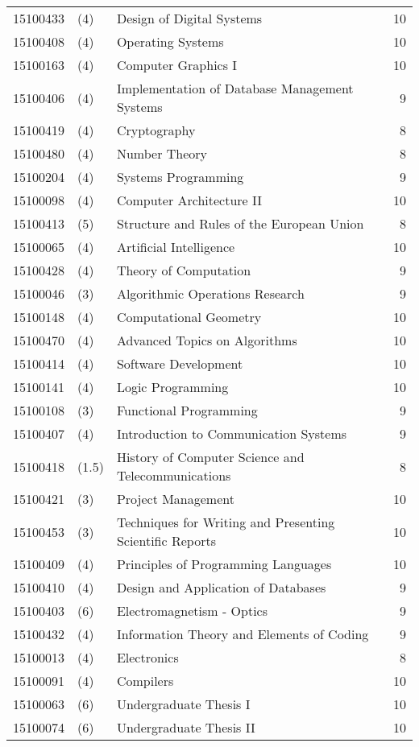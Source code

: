\documentclass[11pt,a4paper]{article}
\begin{document}
\begin{center}
\begin{longtable}{lllr}
    15100433 & (4) & Design of Digital Systems & 10 \\
    15100408 & (4) & Operating Systems & 10 \\
    15100163 & (4) & Computer Graphics I & 10 \\
    15100406 & (4) & Implementation of Database Management Systems & 9 \\
    15100419 & (4) & Cryptography & 8 \\
    15100480 & (4) & Number Theory & 8 \\
    15100204 & (4) & Systems Programming & 9 \\
    15100098 & (4) & Computer Architecture II & 10 \\
    15100413 & (5) & Structure and Rules of the European Union & 8 \\

    15100065 & (4) & Artificial Intelligence & 10 \\
    15100428 & (4) & Theory of Computation & 9 \\
    15100046 & (3) & Algorithmic Operations Research & 9 \\
    15100148 & (4) & Computational Geometry & 10 \\
    15100470 & (4) & Advanced Topics on Algorithms & 10 \\
    15100414 & (4) & Software Development & 10 \\
    15100141 & (4) & Logic Programming & 10 \\
    15100108 & (3) & Functional Programming & 9 \\
    15100407 & (4) & Introduction to Communication Systems & 9 \\
    15100418 & (1.5) & History of Computer Science and Telecommunications & 8 \\
    15100421 & (3) & Project Management & 10 \\
    15100453 & (3) & Techniques for Writing and Presenting Scientific Reports & 10 \\
    
    15100409 & (4) & Principles of Programming Languages & 10 \\
    15100410 & (4) & Design and Application of Databases & 9 \\
    15100403 & (6) & Electromagnetism - Optics & 9 \\
    15100432 & (4) & Information Theory and Elements of Coding & 9 \\
    15100013 & (4) & Electronics & 8 \\
    15100091 & (4) & Compilers & 10 \\

    15100063 & (6) & Undergraduate Thesis I  & 10 \\
    15100074 & (6) & Undergraduate Thesis II  & 10 \\

    \bottomrule
  \end{longtable}
\end{center}
\end{document}
